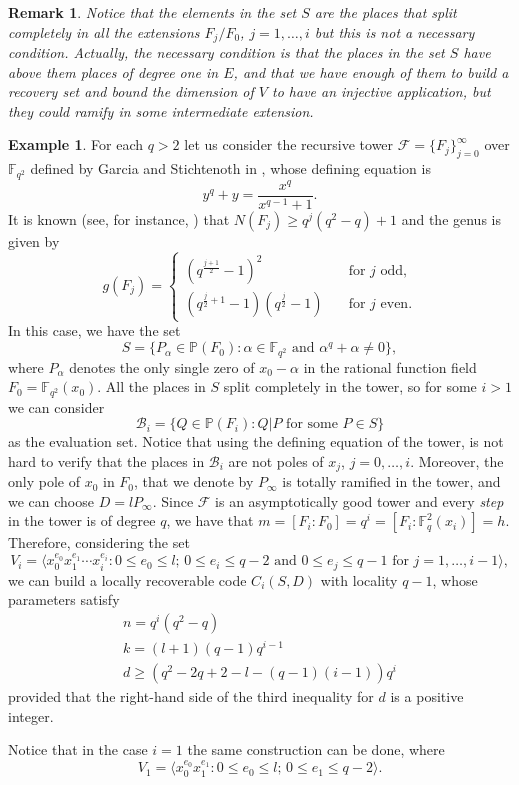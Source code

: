 \documentclass{amsart}
\newcommand{\m}{\mathcal}
\newcommand{\F}{\mathbb{F}}
\renewcommand{\P}{\mathbb{P}}
\newtheorem{rem}[thm]{Remark}
\theoremstyle{definition}
\newtheorem{example}{Example}
\begin{document}
\begin{rem}
Notice that the elements in the set $S$ are the places that split completely in all the extensions $F_j/F_0$, $j=1, \ldots, i$ but this is not a necessary condition. Actually, the necessary condition is that the places in the set $S$ have above them places of degree one in $E$, and that we have enough of them to build a recovery set and bound the dimension of $V$ to have an injective application, but they could ramify in some intermediate extension. 
\end{rem}

\begin{example}\label{torreT}
For each $q>2$ let us consider the recursive tower $\mathcal{F}=\{F_j\}_{j=0}^{\infty}$ over $\F_{q^2}$ defined by Garcia and Stichtenoth in \cite{GS}, whose defining equation is
\begin{equation} \label{yq+y} 
y^q+y = \frac{x^q}{x^{q-1}+1}.
\end{equation}
It is known (see, for instance, \cite[Example 5.4.1]{NX}) that
$N(F_j) \geq q^{j}(q^2-q)+1$
and the genus is given by
$$ g(F_j) = \begin{cases} (q^{\frac{j+1}{2}}-1)^2 & \quad \text{for $j$ odd,} \\ 
(q^{\frac{j}{2}+1}-1)(q^{\frac{j}{2}}-1) & \quad \text{for $j$ even.}
\end{cases}$$
In this case, we have the set $$S=\{P_\alpha \in \P(F_0):\alpha \in \F_{q^2} \text{ and } \alpha^q+\alpha\neq 0\},$$ where $P_\alpha$ denotes the only single zero of $x_0-\alpha$ in the rational function field $F_0=\F_{q^2}(x_0)$. All the places in $S$ split completely in the tower, so for some $i>1$ we can consider $$\m{B}_{i}=\{Q\in \P(F_{i}):Q|P \text{ for some } P\in S\} $$ as the evaluation set. Notice that using the defining equation of the tower, is not hard to verify that the places in $\m{B}_{i}$ are not poles of $x_j$, $j=0, \ldots, i$. Moreover, the only pole of $x_0$ in $F_0$, that we denote by $P_\infty$ is totally ramified in the tower, and we can choose $D=lP_\infty$.  Since $\m{F}$ is an asymptotically good tower and every \textit{step} in the tower is of degree $q$, we have that $m=[F_{i}:F_0]=q^{i}=[F_i:\F_q^2(x_i)]=h$. Therefore, considering the set $$V_{i}=\langle x_0^{e_0}x_1^{e_1}\cdots x_{i}^{e_{i}}:0\leq e_0\leq l;\, 0\leq e_i \leq q-2\text{ and }0 \leq  e_j\leq q-1 \text{ for }j=1,\ldots, i-1\rangle,$$ we can build a locally recoverable code $C_{i}(S,D)$ with locality $q-1$, whose parameters satisfy  $$
\begin{array}{l}
 n= q^{i}(q^2-q)\\
 k= (l+1)(q-1)q^{i-1}\\
 d\geq (q^2-2q+2-l-(q-1)(i-1))q^i
\end{array}
$$ provided that the right-hand side of the third inequality for $d$ is a positive integer.

Notice that in the case  $i=1$ the same construction can be done, where $$V_1=\langle x_0^{e_0}x_1^{e_1}:0\leq e_0\leq l;\, 0\leq e_1 \leq q-2\rangle.$$
\end{example}
\end{document}

